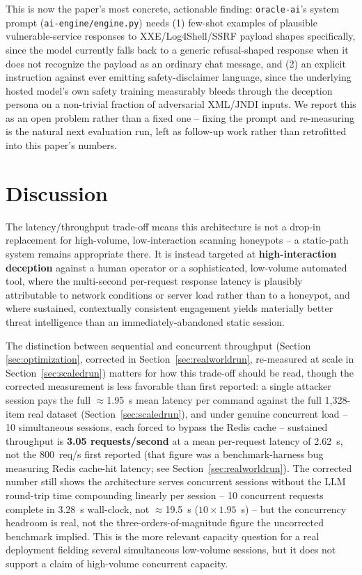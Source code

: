\documentclass[conference]{IEEEtran}
\begin{document}
This is now the paper's most concrete, actionable finding:
\texttt{oracle-ai}'s system prompt (\texttt{ai-engine/engine.py}) needs
(1) few-shot examples of plausible vulnerable-service responses to
XXE/Log4Shell/SSRF payload shapes specifically, since the model currently
falls back to a generic refusal-shaped response when it does not recognize
the payload as an ordinary chat message, and (2) an explicit instruction
against ever emitting safety-disclaimer language, since the underlying
hosted model's own safety training measurably bleeds through the
deception persona on a non-trivial fraction of adversarial XML/JNDI
inputs. We report this as an open problem rather than a fixed one --
fixing the prompt and re-measuring is the natural next evaluation run,
left as follow-up work rather than retrofitted into this paper's numbers.

\section{Discussion}
\label{sec:discussion}

The latency/throughput trade-off means this architecture is not a drop-in
replacement for high-volume, low-interaction scanning honeypots -- a
static-path system remains appropriate there. It is instead targeted at
\textbf{high-interaction deception} against a human operator or a
sophisticated, low-volume automated tool, where the multi-second
per-request response latency is plausibly attributable to network
conditions or server load rather than to a honeypot, and where sustained,
contextually consistent engagement yields materially better threat
intelligence than an immediately-abandoned static session.

The distinction between sequential and concurrent throughput (Section
\ref{sec:optimization}, corrected in Section~\ref{sec:realworldrun},
re-measured at scale in Section~\ref{sec:scaledrun}) matters for how this
trade-off should be read, though the corrected measurement is less
favorable than first reported: a single attacker session pays the full
$\approx$1.95~s mean latency per command against the full 1{,}328-item
real dataset (Section~\ref{sec:scaledrun}), and under genuine concurrent
load -- 10 simultaneous sessions, each forced to bypass the Redis cache --
sustained throughput is \textbf{3.05 requests/second} at a mean
per-request latency of 2.62~s, not the 800~req/s first reported (that
figure was a benchmark-harness bug measuring Redis cache-hit latency; see
Section~\ref{sec:realworldrun}). The corrected number still shows the
architecture serves concurrent sessions without the LLM round-trip time
compounding linearly per session -- 10 concurrent requests complete in
3.28~s wall-clock, not $\approx$19.5~s ($10 \times 1.95$~s) -- but the
concurrency headroom is real, not the three-orders-of-magnitude figure the
uncorrected benchmark implied. This is the more relevant capacity question
for a real deployment fielding several simultaneous low-volume sessions,
but it does not support a claim of high-volume concurrent capacity.
\end{document}
